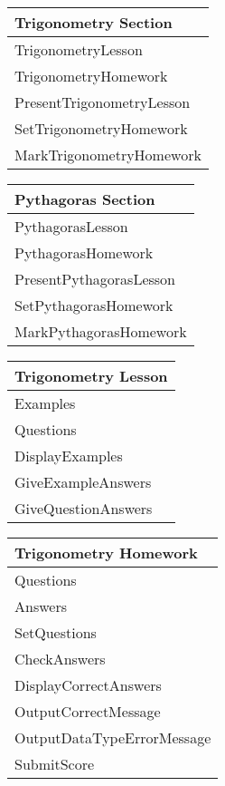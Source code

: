 \begin{center}
\begin{tabular}{|p{5cm}|} \hline
Trigonometry Section \\ \hline
TrigonometryLesson \\
TrigonometryHomework \\ \hline
PresentTrigonometryLesson \\
SetTrigonometryHomework \\
MarkTrigonometryHomework \\ \hline
\end{tabular}
\end{center}

\begin{center}
\begin{tabular}{|p{5cm}|} \hline
Pythagoras Section \\ \hline
PythagorasLesson \\
PythagorasHomework \\ \hline
PresentPythagorasLesson \\
SetPythagorasHomework \\
MarkPythagorasHomework \\ \hline
\end{tabular}
\end{center}

\begin{center}
\begin{tabular}{|p{5cm}|} \hline
Trigonometry Lesson \\ \hline
Examples \\
Questions \\ \hline
DisplayExamples \\
GiveExampleAnswers \\
GiveQuestionAnswers \\ \hline
\end{tabular}
\end{center}

\begin{center}
\begin{tabular}{|p{5cm}|} \hline
Trigonometry Homework \\ \hline
Questions \\
Answers \\ \hline
SetQuestions \\
CheckAnswers \\
DisplayCorrectAnswers \\
OutputCorrectMessage \\
OutputDataTypeErrorMessage \\
SubmitScore \\ \hline
\end{tabular}
\end{center}

